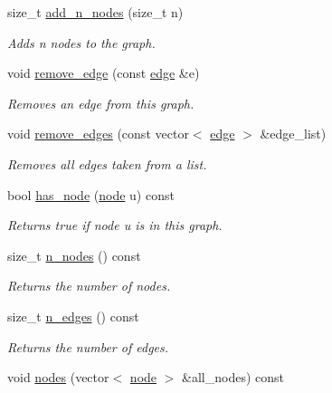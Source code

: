\begin{DoxyCompactItemize}
size\-\_\-t \hyperlink{classlgraph_1_1utils_1_1xxgraph_ae1283d13858ea06a6999626a01d12e4b}{add\-\_\-n\-\_\-nodes} (size\-\_\-t n)
\begin{DoxyCompactList}\small\item\em Adds {\itshape n} nodes to the graph. \end{DoxyCompactList}\item 
void \hyperlink{classlgraph_1_1utils_1_1xxgraph_af826c05492f237d7727f88ebab033001}{remove\-\_\-edge} (const \hyperlink{namespacelgraph_1_1utils_a6510284ce1b1ae5dc97ce5d2de426e10}{edge} \&e)
\begin{DoxyCompactList}\small\item\em Removes an edge from this graph. \end{DoxyCompactList}\item 
void \hyperlink{classlgraph_1_1utils_1_1xxgraph_a747da8a567d232081199499f23821926}{remove\-\_\-edges} (const vector$<$ \hyperlink{namespacelgraph_1_1utils_a6510284ce1b1ae5dc97ce5d2de426e10}{edge} $>$ \&edge\-\_\-list)
\begin{DoxyCompactList}\small\item\em Removes all edges taken from a list. \end{DoxyCompactList}\item 
\hypertarget{classlgraph_1_1utils_1_1xxgraph_a026ab064c2be26790cc1f547be2157c9}{bool \hyperlink{classlgraph_1_1utils_1_1xxgraph_a026ab064c2be26790cc1f547be2157c9}{has\-\_\-node} (\hyperlink{namespacelgraph_1_1utils_a7bd66ede3805ef121bc2835bd48de0cf}{node} u) const }\label{classlgraph_1_1utils_1_1xxgraph_a026ab064c2be26790cc1f547be2157c9}

\begin{DoxyCompactList}\small\item\em Returns true if node {\itshape u} is in this graph. \end{DoxyCompactList}\item 
size\-\_\-t \hyperlink{classlgraph_1_1utils_1_1xxgraph_ad345f1fbf1dee34e1579b5aea9aef9b2}{n\-\_\-nodes} () const 
\begin{DoxyCompactList}\small\item\em Returns the number of nodes. \end{DoxyCompactList}\item 
size\-\_\-t \hyperlink{classlgraph_1_1utils_1_1xxgraph_af3f7c3835406c2cbf70479ae1c0253c9}{n\-\_\-edges} () const 
\begin{DoxyCompactList}\small\item\em Returns the number of edges. \end{DoxyCompactList}\item 
\hypertarget{classlgraph_1_1utils_1_1xxgraph_a99f83387aa9f59b861e675251be5a3ad}{void \hyperlink{classlgraph_1_1utils_1_1xxgraph_a99f83387aa9f59b861e675251be5a3ad}{nodes} (vector$<$ \hyperlink{namespacelgraph_1_1utils_a7bd66ede3805ef121bc2835bd48de0cf}{node} $>$ \&all\-\_\-nodes) const }\label{classlgraph_1_1utils_1_1xxgraph_a99f83387aa9f59b861e675251be5a3ad}


\end{DoxyCompactItemize}
